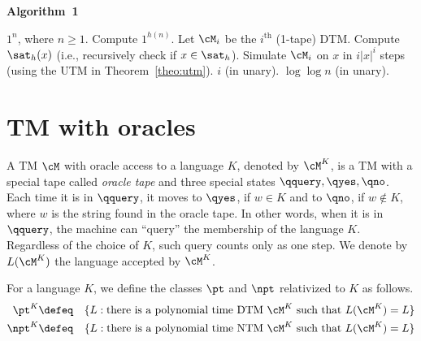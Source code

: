 \documentclass[11pt, a4paper]{article}
\begin{document}
\begin{algorithm}
\label{alg:ladner}
\caption{\bf Algorithm~1}
\begin{algorithmic}[1]
\REQUIRE
$1^n$, where $n\geq 1$.
\ENSURE
Compute $1^{h(n)}$.
\STATE
Let $\cM_i$ be the $i^{\text{th}}$ (1-tape) DTM.
\STATE
Compute $\sat_h(x)$ (i.e., recursively check if $x\in \sat_h$).
\STATE
Simulate $\cM_i$ on $x$ in $i|x|^i$ steps (using the UTM in Theorem~\ref{theo:utm}).
\ENDFOR
{}
\RETURN $i$ (in unary).
\ENDIF
\ENDFOR
\RETURN $\log\log n$ (in unary).
\end{algorithmic}
\end{algorithm}






\section{TM with oracles}

A TM $\cM$ with oracle access to a language $K$, denoted by $\cM^K$, 
is a TM with a special tape called {\em oracle tape} and three special states $\qquery,\qyes,\qno$.
Each time it is in $\qquery$,
it moves to $\qyes$, if $w\in K$
and to $\qno$, if $w\notin K$, where $w$ is the string found in the oracle tape.
In other words, when it is in $\qquery$, the machine can ``query'' the membership of the language $K$. 
Regardless of the choice of $K$, such query counts only as one step.
We denote by $L(\cM^K)$ the language accepted by $\cM^K$.

For a language $K$, we define the classes $\pt$ and $\npt$ relativized to $K$ as follows.
\begin{eqnarray*}
\pt^K &\defeq & \{L : \text{there is a polynomial time DTM}\ \cM^K \ \text{such that} \  L(\cM^K)=L\}
\\
\npt^K & \defeq & \{L : \text{there is a polynomial time NTM}\ \cM^K \ \text{such that} \  L(\cM^K)=L\}
\end{eqnarray*}
\end{document}
